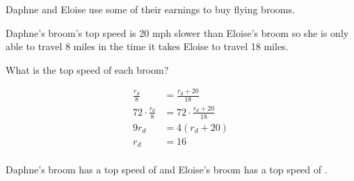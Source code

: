 \documentclass[letterpaper, landscape]{exam}
\begin{document}
\begin{questions}




    \bonusquestion[15] 
      Daphne and Eloise use some of their earnings to buy flying brooms. 
      
      Daphne's broom's top speed is 20 mph slower than Eloise's broom so she is only able to travel
      8 miles in the time it takes Eloise to travel 18 miles. 
      
      What is the top speed of each broom?

      \ifprintanswers{}
        \newpage
      \fi

      \begin{solution}
        \begin{align*}
          \frac{r_{d}}{8}          & = \frac{r_{d} + 20}{18} \\
          72 \cdot \frac{r_{d}}{8} & = 72 \cdot \frac{r_{d} + 20}{18} \\
          9r_{d}                   & = 4 (r_{d} + 20) \\
          r_{d}                    & = 16 \\
        \end{align*}

        Daphne's broom has a top speed of  and Eloise's broom
        has a top speed of .
      \end{solution}

  \end{questions}
\end{document}
